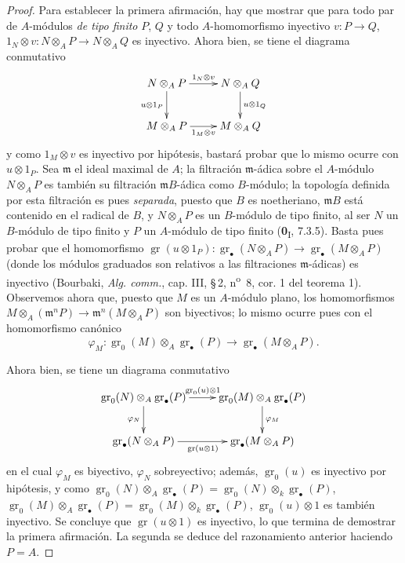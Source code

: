 \begin{proof}
Para establecer la primera afirmación, hay que mostrar que para todo par de
$A$-módulos \emph{de tipo finito} $P$, $Q$ y todo $A$-homomorfismo inyectivo
$v:P\to Q$,
$1_N\otimes v:N\otimes_AP\to N\otimes_AQ$ es inyectivo. Ahora bien, se tiene el
diagrama conmutativo
\[
\xymatrix{
N\otimes_AP\ar[r]^{1_N\otimes v}\ar[d]_{u\otimes1_P}
  &N\otimes_AQ\ar[d]^{u\otimes1_Q}\\
M\otimes_AP\ar[r]_{1_M\otimes v}
  &M\otimes_AQ
}
\]
y como $1_M\otimes v$ es inyectivo por hipótesis, bastará probar
que lo mismo ocurre con $u\otimes1_P$. Sea $\mathfrak m$ el ideal maximal
de $A$; la filtración $\mathfrak m$-ádica sobre el $A$-módulo
$N\otimes_AP$ es también su filtración $\mathfrak mB$-ádica como
$B$-módulo; la topología definida por esta filtración es pues \emph{separada},
puesto que $B$ es noetheriano, $\mathfrak mB$ está contenido en el radical de
$B$, y $N\otimes_AP$ es un $B$-módulo de tipo finito, al ser $N$ un
$B$-módulo de tipo finito y $P$ un $A$-módulo de tipo finito
(\textbf{0}\textsubscript{I}, 7.3.5). Basta pues probar que el homomorfismo
$\operatorname{gr}(u\otimes1_P):
\operatorname{gr}_\bullet(N\otimes_AP)
\longrightarrow
\operatorname{gr}_\bullet(M\otimes_AP)$
(donde los módulos graduados son relativos a las filtraciones $\mathfrak m$-ádicas)
es inyectivo (Bourbaki, \emph{Alg. comm.}, cap. III, \S\,2, n\textsuperscript{o}~8, cor. 1 del
teorema 1). Observemos ahora que, puesto que $M$ es un $A$-módulo plano, los
homomorfismos
$M\otimes_A(\mathfrak m^nP)
\longrightarrow
\mathfrak m^n(M\otimes_AP)$
son biyectivos; lo mismo ocurre pues con el homomorfismo canónico
\[
\varphi_M:
\operatorname{gr}_0(M)\otimes_A\operatorname{gr}_\bullet(P)
\longrightarrow
\operatorname{gr}_\bullet(M\otimes_AP).
\]


Ahora bien, se tiene un diagrama conmutativo
\[
\xymatrix{
\operatorname{gr}_0(N)\otimes_A\operatorname{gr}_\bullet(P)
  \ar[r]^{\operatorname{gr}_0(u)\otimes1}\ar[d]_{\varphi_N}
  &\operatorname{gr}_0(M)\otimes_A\operatorname{gr}_\bullet(P)
  \ar[d]^{\varphi_M}\\
\operatorname{gr}_\bullet(N\otimes_AP)
  \ar[r]_{\operatorname{gr}(u\otimes1)}
  &\operatorname{gr}_\bullet(M\otimes_AP)
}
\]
en el cual $\varphi_M$ es biyectivo, $\varphi_N$ sobreyectivo; además,
$\operatorname{gr}_0(u)$ es inyectivo por hipótesis, y como
$\operatorname{gr}_0(N)\otimes_A\operatorname{gr}_\bullet(P)
=\operatorname{gr}_0(N)\otimes_k\operatorname{gr}_\bullet(P)$,
$\operatorname{gr}_0(M)\otimes_A\operatorname{gr}_\bullet(P)
=\operatorname{gr}_0(M)\otimes_k\operatorname{gr}_\bullet(P)$,
$\operatorname{gr}_0(u)\otimes1$ es también inyectivo. Se concluye que
$\operatorname{gr}(u\otimes1)$ es inyectivo, lo que termina de demostrar la
primera afirmación. La segunda se deduce del razonamiento anterior haciendo
$P=A$.
\end{proof}

